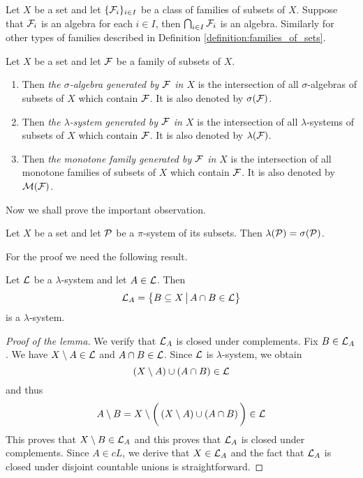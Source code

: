 \begin{remark}\label{remark:intersections}
    Let $X$ be a set and let $\{{\mathcal F}_i\}_{i\in I}$ be a class of families of subsets of $X$. Suppose that ${\mathcal F}_i$ is an algebra for each $i \in I$, then $\bigcap_{i\in I}{\mathcal F}_i$ is an algebra. Similarly for other types of families described in Definition \ref{definition:families_of_sets}.
\end{remark}

\begin{definition}
    Let $X$ be a set and let ${\mathcal F}$ be a family of subsets of $X$.
    \begin{enumerate}[label=\textbf{(\arabic*)}, leftmargin=*]
        \item Then \textit{the $\sigma$-algebra generated by ${\mathcal F}$ in $X$} is the intersection of all $\sigma$-algebras of subsets of $X$ which contain ${\mathcal F}$. It is also denoted by $\sigma({\mathcal F})$.
        \item Then \textit{the $\lambda$-system generated by ${\mathcal F}$ in $X$} is the intersection of all $\lambda$-systems of subsets of $X$ which contain ${\mathcal F}$. It is also denoted by $\lambda({\mathcal F})$.
        \item Then \textit{the monotone family generated by ${\mathcal F}$ in $X$} is the intersection of all monotone families of subsets of $X$ which contain ${\mathcal F}$. It is also denoted by ${\mathcal M}({\mathcal F})$.
    \end{enumerate}
\end{definition}
\noindent
Now we shall prove the important observation.

\begin{theorem}\label{theorem:dynkins_lemma}
    Let $X$ be a set and let ${\mathcal P}$ be a $\pi$-system of its subsets. Then $\lambda({\mathcal P})=\sigma({\mathcal P})$.
\end{theorem}
\noindent
For the proof we need the following result.

\begin{lemma}\label{lemma:dynkins_lemma}
    Let ${\mathcal L}$ be a $\lambda$-system and let $A \in {\mathcal L}$. Then
    $${\mathcal L}_A=\big\{B\subseteq X\,\big|\,A\cap B\in {\mathcal L} \big\}$$
    is a $\lambda$-system.
\end{lemma}
\begin{proof}[Proof of the lemma]
    We verify that ${\mathcal L}_A$ is closed under complements. Fix $B \in {\mathcal L}_A$. We have $X\setminus A \in {\mathcal L}$ and $A\cap B\in {\mathcal L}$. Since ${\mathcal L}$ is $\lambda$-system, we obtain
    $$\left(X\setminus A\right)\cup \left(A\cap B\right)\in {\mathcal L}$$
    and thus
    $$A\setminus B = X\setminus \bigg(\left(X\setminus A\right)\cup \left(A\cap B\right)\bigg) \in {\mathcal L}$$
    This proves that $X\setminus B \in {\mathcal L}_A$ and this proves that ${\mathcal L}_A$ is closed under complements. Since $A\in cL$, we derive that $X\in {\mathcal L}_A$ and the fact that ${\mathcal L}_A$ is closed under disjoint countable unions is straightforward.
\end{proof}

